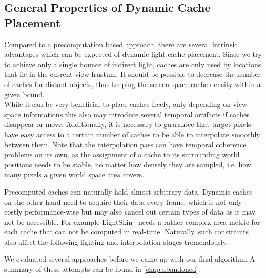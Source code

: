 \documentclass[thesis.tex]{subfiles}
\begin{document}
\subsection{General Properties of Dynamic Cache Placement} \label{sec:impl:dyncacheplace}
Compared to a precomputation based approach, there are several intrinsic advantages which can be expected of dynamic light cache placement.
Since we try to achieve only a single bounce of indirect light, caches are only used by locations that lie in the current view frustum. %
It should be possible to decrease the number of caches for distant objects, thus keeping the screen-space cache density within a given bound.
\\
While it can be very beneficial to place caches freely, only depending on view space informations this also may introduce several temporal artifacts if caches disappear or move. %
Additionally, it is necessary to guarantee that target pixels have easy access to a certain number of caches to be able to interpolate smoothly between them.
Note that the interpolation pass can have temporal coherence problems on its own, as the assignment of a cache to its surrounding world positions needs to be stable, no matter how densely they are sampled, i.e. how many pixels a given world space area covers.

Precomputed caches can naturally hold almost arbitrary data. %
Dynamic caches on the other hand need to acquire their data every frame, which is not only costly performance-wise but may also cancel out certain types of data as it may not be accessible.
For example LightSkin~\cite{bib:LightskinPaper} needs a rather complex area metric for each cache that can not be computed in real-time.
Naturally, such constraints also affect the following lighting and interpolation stages tremendously.

We evaluated several approaches before we came up with our final algorithm.
A summary of these attempts can be found in \autoref{chap:abandoned}.
\end{document}

